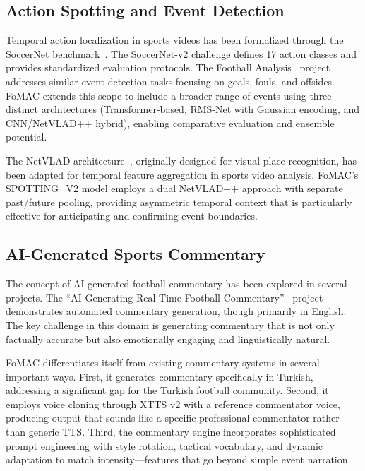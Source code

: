 \documentclass[10pt,twocolumn,a4paper]{article}
\begin{document}
\subsection{Action Spotting and Event Detection}

Temporal action localization in sports videos has been formalized through the SoccerNet benchmark~\cite{soccernet}. The SoccerNet-v2 challenge defines 17 action classes and provides standardized evaluation protocols. The Football Analysis~\cite{football_analysis} project addresses similar event detection tasks focusing on goals, fouls, and offsides. FoMAC extends this scope to include a broader range of events using three distinct architectures (Transformer-based, RMS-Net with Gaussian encoding, and CNN/NetVLAD++ hybrid), enabling comparative evaluation and ensemble potential.

The NetVLAD architecture~\cite{arandjelovic2016netvlad}, originally designed for visual place recognition, has been adapted for temporal feature aggregation in sports video analysis. FoMAC's SPOTTING\_V2 model employs a dual NetVLAD++ approach with separate past/future pooling, providing asymmetric temporal context that is particularly effective for anticipating and confirming event boundaries.

\subsection{AI-Generated Sports Commentary}

The concept of AI-generated football commentary has been explored in several projects. The ``AI Generating Real-Time Football Commentary''~\cite{football_ai_commentary} project demonstrates automated commentary generation, though primarily in English. The key challenge in this domain is generating commentary that is not only factually accurate but also emotionally engaging and linguistically natural.

FoMAC differentiates itself from existing commentary systems in several important ways. First, it generates commentary specifically in Turkish, addressing a significant gap for the Turkish football community. Second, it employs voice cloning through XTTS v2 with a reference commentator voice, producing output that sounds like a specific professional commentator rather than generic TTS. Third, the commentary engine incorporates sophisticated prompt engineering with style rotation, tactical vocabulary, and dynamic adaptation to match intensity---features that go beyond simple event narration.
\end{document}
